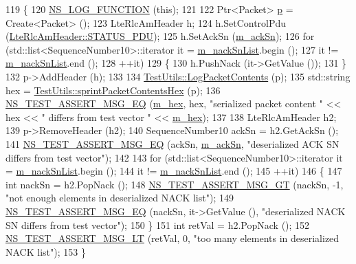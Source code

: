 \begin{DoxyCode}
119 \{
120   \hyperlink{log-macros-disabled_8h_a90b90d5bad1f39cb1b64923ea94c0761}{NS\_LOG\_FUNCTION} (\textcolor{keyword}{this});
121   
122   Ptr<Packet> \hyperlink{lte__link__budget_8m_ac9de518908a968428863f829398a4e62}{p} = Create<Packet> ();
123   LteRlcAmHeader h;
124   h.SetControlPdu (\hyperlink{classns3_1_1LteRlcAmHeader_a91ebd7f63ef09e33d7755c660add464ea2d662e6a06cefca8c790c83cc2f5ed95}{LteRlcAmHeader::STATUS\_PDU});
125   h.SetAckSn (\hyperlink{classns3_1_1RlcAmStatusPduTestCase_a85b9fb8db0cebdec174b75f79ce32cc3}{m\_ackSn});
126   \textcolor{keywordflow}{for} (std::list<SequenceNumber10>::iterator it = \hyperlink{classns3_1_1RlcAmStatusPduTestCase_a31448a699ee0c00b8176dc83bd1e6635}{m\_nackSnList}.begin ();
127        it != \hyperlink{classns3_1_1RlcAmStatusPduTestCase_a31448a699ee0c00b8176dc83bd1e6635}{m\_nackSnList}.end ();
128        ++it)
129     \{
130       h.PushNack (it->GetValue ());
131     \}
132   p->AddHeader (h);  
133 
134   \hyperlink{classns3_1_1TestUtils_a94c378ff1bc8e71d2e33ec4f4df5eac0}{TestUtils::LogPacketContents} (p);
135   std::string hex = \hyperlink{classns3_1_1TestUtils_a25685c544612a39f0cb6c09000c32436}{TestUtils::sprintPacketContentsHex} (p);
136   \hyperlink{group__testing_ga2a9d78cffb3db8e867c35fff0b698cf5}{NS\_TEST\_ASSERT\_MSG\_EQ} (\hyperlink{classns3_1_1RlcAmStatusPduTestCase_a1c5a4599d69e0f98722c2c5e3c89bf76}{m\_hex}, hex, \textcolor{stringliteral}{"serialized packet content "} << hex << \textcolor{stringliteral}{"
       differs from test vector "} << \hyperlink{classns3_1_1RlcAmStatusPduTestCase_a1c5a4599d69e0f98722c2c5e3c89bf76}{m\_hex});
137   
138   LteRlcAmHeader h2;
139   p->RemoveHeader (h2);
140   SequenceNumber10 ackSn = h2.GetAckSn ();
141   \hyperlink{group__testing_ga2a9d78cffb3db8e867c35fff0b698cf5}{NS\_TEST\_ASSERT\_MSG\_EQ} (ackSn, \hyperlink{classns3_1_1RlcAmStatusPduTestCase_a85b9fb8db0cebdec174b75f79ce32cc3}{m\_ackSn}, \textcolor{stringliteral}{"deserialized ACK SN differs from test
       vector"});
142   
143   \textcolor{keywordflow}{for} (std::list<SequenceNumber10>::iterator it = \hyperlink{classns3_1_1RlcAmStatusPduTestCase_a31448a699ee0c00b8176dc83bd1e6635}{m\_nackSnList}.begin ();
144        it != \hyperlink{classns3_1_1RlcAmStatusPduTestCase_a31448a699ee0c00b8176dc83bd1e6635}{m\_nackSnList}.end ();
145        ++it)
146     \{
147       \textcolor{keywordtype}{int} nackSn = h2.PopNack ();
148       \hyperlink{group__testing_ga868cfb773df312b867a506bdd2e3cbef}{NS\_TEST\_ASSERT\_MSG\_GT} (nackSn, -1, \textcolor{stringliteral}{"not enough elements in deserialized NACK
       list"});
149       \hyperlink{group__testing_ga2a9d78cffb3db8e867c35fff0b698cf5}{NS\_TEST\_ASSERT\_MSG\_EQ} (nackSn, it->GetValue (), \textcolor{stringliteral}{"deserialized NACK SN  differs
       from test vector"});
150     \}
151   \textcolor{keywordtype}{int} retVal = h2.PopNack ();
152   \hyperlink{group__testing_ga1d96848b91407c9a0b36583e8b0ad7ae}{NS\_TEST\_ASSERT\_MSG\_LT} (retVal, 0, \textcolor{stringliteral}{"too many elements in deserialized NACK list"});
153 \}
\end{DoxyCode}



